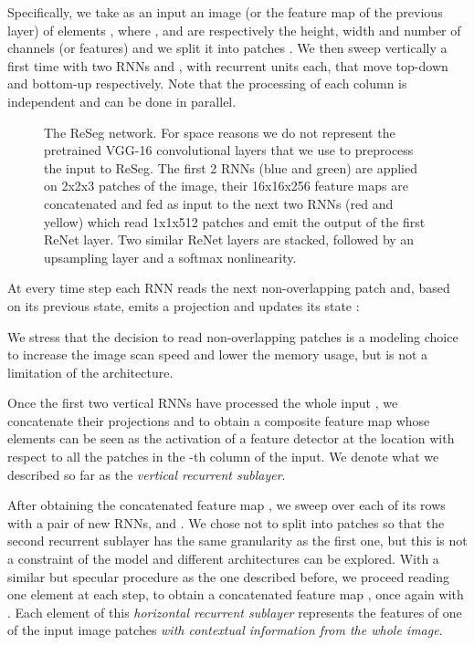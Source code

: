 \documentclass[times,art10,twocolumn,latex8]{article}
\begin{document}
Specifically, we take as an input an image (or the feature map of the previous
layer)  of elements , where ,
 and  are respectively the height, width and number of channels (or
features) and we split it into  patches . We then sweep vertically a first time with two RNNs  and ,
with  recurrent units each, that move top-down and bottom-up respectively.
Note that the processing of each column is independent and can be done in
parallel.

\begin{figure*}[t]
    \advance{}\textwidth
    \centering
    \caption{The ReSeg network. For space reasons we do not represent the
        pretrained VGG-16 convolutional layers that we use to preprocess
        the input to ReSeg. The first 2 RNNs (blue and green) are applied on
        2x2x3 patches of the image, their 16x16x256 feature maps are
        concatenated and fed as input to the next two RNNs (red and yellow)
        which read 1x1x512 patches and emit the output of the first ReNet
        layer. Two similar ReNet layers are stacked, followed by an upsampling
        layer and a softmax nonlinearity.}
    \label{fig:ReSeg}
\end{figure*}

At every time step each RNN reads the next non-overlapping patch
 and, based on its previous
state, emits a projection  and updates its state
:

We stress that the decision to read non-overlapping patches is a modeling
choice to increase the image scan speed and lower the memory usage, but is not
a limitation of the architecture.

Once the first two vertical RNNs have processed the whole input , we
concatenate their projections  and 
to obtain a composite feature map  whose elements
 can be seen as the activation of a
feature detector at the location  with respect to all the patches in the
-th column of the input. We denote what we described so far as the
\emph{vertical recurrent sublayer}.

After obtaining the concatenated feature map , we
sweep over each of its rows with a pair of new RNNs,  and
. We chose not to split  into
patches so that the second recurrent sublayer has the same granularity as the
first one, but this is not a constraint of the model and different
architectures can be explored.  With a similar but specular procedure as the
one described before, we proceed reading one element  at
each step, to obtain a concatenated feature map
, once again with . Each element  of this \emph{horizontal
recurrent sublayer} represents the features of one of the input image patches
 \emph{with contextual information from the whole image}.
\end{document}

